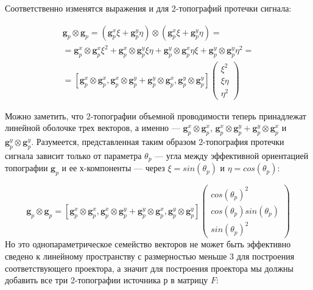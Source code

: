 Соответственно изменятся выражения и для 2-топографий протечки сигнала:

\begin{gather}
    \mathbf{g}_p \otimes \mathbf{g}_p = (\mathbf{g}_p^x \xi 
                                      + \mathbf{g}_p^y \eta) \otimes (\mathbf{g}_p^x \xi 
                                      + \mathbf{g}_p^y \eta) = \nonumber \\
                                      = \mathbf{g}_p^x \otimes \mathbf{g}_p^x \xi^2 
                                      + \mathbf{g}_p^x \otimes \mathbf{g}_p^y \xi \eta 
                                      + \mathbf{g}_p^y\otimes  \mathbf{g}_p^x \eta \xi
                                      + \mathbf{g}_p^y \otimes \mathbf{g}_p^y \eta^2 = \nonumber \\
                                      = [\mathbf{g}_p^x \otimes \mathbf{g}_p^x,
                                         \mathbf{g}_p^x \otimes \mathbf{g}_p^y
                                      + \mathbf{g}_p^y \otimes \mathbf{g}_p^x,
                                        \mathbf{g}_p^y \otimes \mathbf{g}_p^y]
\left( \begin{array}{ccc}
\xi^2 \\
\xi \eta \\
\eta^2
\end{array} 
\right)
\end{gather}

Можно заметить, что 2-топографии объемной проводимости теперь принадлежат линейной оболочке трех векторов,
а именно --- $\mathbf{g}_p^x \otimes \mathbf{g}_p^x$, $\mathbf{g}_p^x \otimes \mathbf{g}_p^y + \mathbf{g}_p^y \otimes \mathbf{g}_p^x$ и $\mathbf{g}_p^y \otimes \mathbf{g}_p^y$. Разумеется, представленная таким образом 2-топография протечки сигнала зависит только от параметра $\theta_p$ --- угла между эффективной ориентацией топографии $\mathbf{g}_p$ и ее $х$-компоненты --- через $\xi = sin(\theta_p)$ и $\eta=cos(\theta_p)$:

\begin{equation*}
    \mathbf{g}_p \otimes \mathbf{g}_p =[\mathbf{g}_p^x \otimes \mathbf{g}_p^x, \mathbf{g}_p^x \otimes \mathbf{g}_p^y + \mathbf{g}_p^y \otimes \mathbf{g}_p^x, \mathbf{g}_p^y \otimes \mathbf{g}_p^y]
    \left( \begin{array}{ccc}
    cos(\theta_p)^2 \\
    cos(\theta_p) sin(\theta_p) \\
    sin(\theta_p)^2
    \end{array} 
    \right)
\end{equation*}
Но это однопараметрическое семейство векторов не может быть эффективно сведено к линейному
пространству с размерностью меньше 3 для построения соответствующего проектора,
а значит для построения проектора мы должны добавить все три 2-топографии источника $р$ в матрицу $F$:

